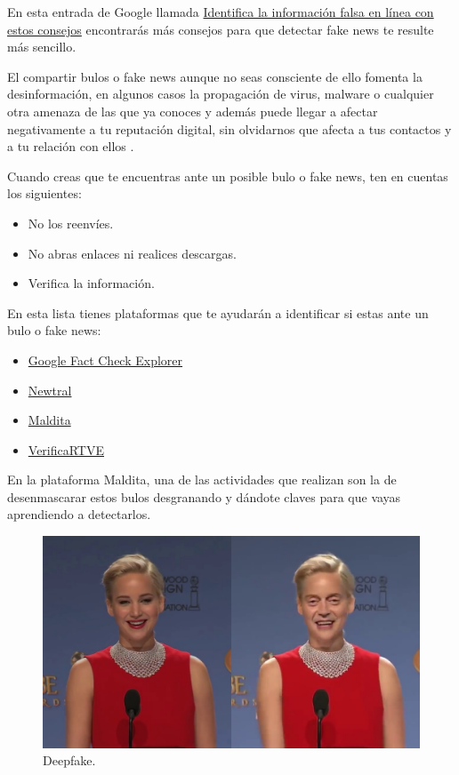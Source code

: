 \documentclass[
  spanish,
  a4paper,
  openany]{book}
\begin{document}
En esta entrada de Google llamada \href{https://blog.google/products/news/consejos-verificacion-hechos/}{Identifica la información falsa en línea con estos consejos} encontrarás más consejos para que detectar fake news te resulte más sencillo.

El compartir bulos o fake news aunque no seas consciente de ello fomenta la desinformación, en algunos casos la propagación de virus, malware o cualquier otra amenaza de las que ya conoces y además puede llegar a afectar negativamente a tu reputación digital, sin olvidarnos que afecta a tus contactos y a tu relación con ellos \citep{OSI-frena-evita-bulos}.

Cuando creas que te encuentras ante un posible bulo o fake news, ten en cuentas los siguientes:

\begin{itemize}
\item
  No los reenvíes.
\item
  No abras enlaces ni realices descargas.
\item
  Verifica la información.
\end{itemize}

En esta lista tienes plataformas que te ayudarán a identificar si estas ante un bulo o fake news:

\begin{itemize}
\item
  \href{https://toolbox.google.com/factcheck/explorer}{Google Fact Check Explorer}
\item
  \href{https://www.newtral.es/zona-verificacion/fact-check/}{Newtral}
\item
  \href{https://maldita.es/malditobulo/1}{Maldita}
\item
  \href{https://www.rtve.es/noticias/verificartve/}{VerificaRTVE}
\end{itemize}

En la plataforma Maldita, una de las actividades que realizan son la de desenmascarar estos bulos desgranando y dándote claves para que vayas aprendiendo a detectarlos.

\begin{figure}

{\centering \includegraphics[width=0.75\linewidth]{images/deepfake} 

}

\caption{Deepfake.}\label{fig:unnamed-chunk-21}
\end{figure}
\end{document}
